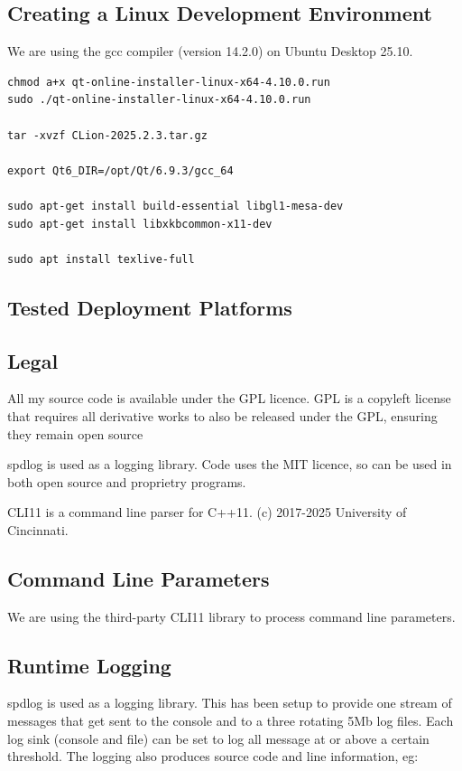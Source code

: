\documentclass[11pt]{article}
\begin{document}
\subsection{Creating a Linux Development Environment}

We are using the gcc compiler (version 14.2.0) on Ubuntu Desktop 25.10.


\begin{lstlisting}
chmod a+x qt-online-installer-linux-x64-4.10.0.run
sudo ./qt-online-installer-linux-x64-4.10.0.run

tar -xvzf CLion-2025.2.3.tar.gz

export Qt6_DIR=/opt/Qt/6.9.3/gcc_64

sudo apt-get install build-essential libgl1-mesa-dev
sudo apt-get install libxkbcommon-x11-dev

sudo apt install texlive-full
\end{lstlisting}

\subsection{Tested Deployment Platforms}


\subsection{Legal}
All my source code is available under the GPL licence. GPL is a copyleft license that requires all derivative works to also be released under the GPL, ensuring they remain open source

\smallskip
spdlog\cite{spdlog} is used as a logging library. Code uses the MIT licence, so can be used in both open source and proprietry programs.

CLI11\cite{CLI11} is a command line parser for C++11. (c) 2017-2025 University of Cincinnati.



\subsection{Command Line Parameters}
We are using the third-party CLI11 library to process command line parameters.

\subsection{Runtime Logging}
spdlog\cite{spdlog} is used as a logging library. This has been setup to provide one stream of messages that get sent to the console and to a three rotating 5Mb log files.
Each log sink (console and file) can be set to log all message at or above a certain threshold. The logging also produces source code and line information, eg:
\end{document}
